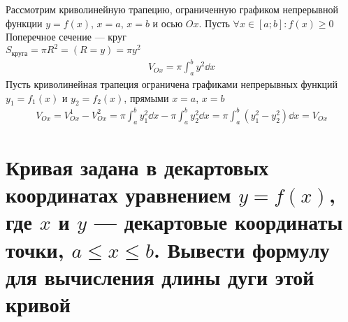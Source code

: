 Рассмотрим криволинейную трапецию, ограниченную графиком непрерывной функции $y = f(x)$, $x = a$, $x = b$ и осью $Ox$. Пусть $\forall x \in [a;b]\colon f(x) \geqslant 0$ \\
Поперечное сечение --- круг\\
$S_{\text{круга}} = \pi R^2 = (R = y) = \pi y^2$
\begin{gather}
    \boxed{V_{Ox} = \pi \int_{a}^{b} y^2 \dd{x}}
\end{gather}
Пусть криволинейная трапеция ограничена графиками непрерывных функций $y_1 = f_1(x)$ и $y_2 = f_2(x)$, прямыми $x=a$, $x=b$ %
\begin{align}
    V_{Ox} = V_{Ox}^1 - V_{Ox}^2 = \pi \int_{a}^{b} y^2_1\dd{x} - \pi \int_{a}^{b} y^2_2\dd{x} = \boxed{\pi \int_{a}^{b} \left(y_1^2 - y_2^2\right) \dd{x} = V_{Ox}}
\end{align}

\newpage
\section{Кривая задана в декартовых координатах уравнением $y=f(x)$, где $x$ и $y$ --- декартовые координаты точки, $a \leqslant x \leqslant b$. Вывести формулу для вычисления длины дуги этой кривой}

